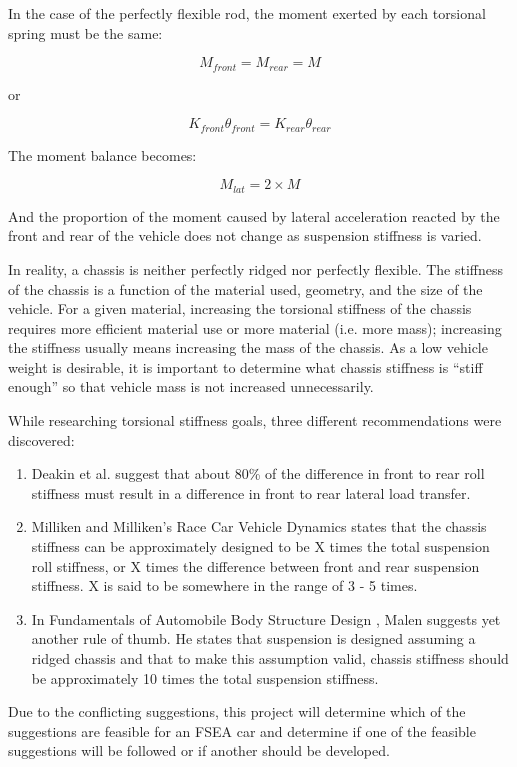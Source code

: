 \documentclass[a4paper]{article}
\numberwithin{equation}{section}
\begin{document}
In the case of the perfectly flexible rod, the moment exerted by each torsional spring must be the same:

$$M_{front} = M_{rear} = M$$
\begin{center}
	or
\end{center}
$$K_{front}\theta_{front} = K_{rear}\theta_{rear}$$

The moment balance becomes:

$$M_{lat} = 2 \times M$$

And the proportion of the moment caused by lateral acceleration reacted by the front and rear of the vehicle does not change as suspension stiffness is varied.

In reality, a chassis is neither perfectly ridged nor perfectly flexible. The stiffness of the chassis is a function of the material used, geometry, and the size of the vehicle. For a given material, increasing the torsional stiffness of the chassis requires more efficient material use or more material (i.e. more mass); increasing the stiffness usually means increasing the mass of the chassis. As a low vehicle weight is desirable, it is important to determine what chassis stiffness is “stiff enough” so that vehicle mass is not increased unnecessarily.

While researching torsional stiffness goals, three different recommendations were discovered:

\begin{enumerate}
	\item Deakin et al. \cite{Deakin} suggest that about 80\% of the difference in front to rear roll stiffness must result in a difference in front to rear lateral load transfer.
	\item Milliken and Milliken’s Race Car Vehicle Dynamics \cite{Milliken} states that the chassis stiffness can be approximately designed to be X times the total suspension roll stiffness, or X times the difference between front and rear suspension stiffness. X is said to be somewhere in the range of 3 - 5 times.
	\item In Fundamentals of Automobile Body Structure Design \cite{Malen}, Malen suggests yet another rule of thumb. He states that suspension is designed assuming a ridged chassis and that to make this assumption valid, chassis stiffness should be approximately 10 times the total suspension stiffness.
\end{enumerate}

Due to the conflicting suggestions, this project will determine which of the suggestions are feasible for an FSEA car and determine if one of the feasible suggestions will be followed or if another should be developed.
\end{document}
